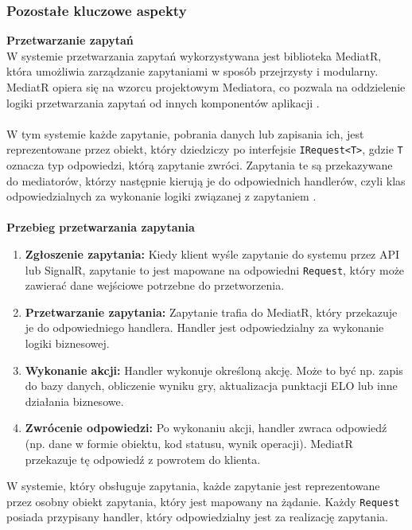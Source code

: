 \documentclass[twoside]{projektInzynierskiMS1}
\begin{document}
\newpage

\subsubsection{Pozostałe kluczowe aspekty}

\noindent \textbf{Przetwarzanie zapytań}\\
W systemie przetwarzania zapytań wykorzystywana jest biblioteka MediatR, która umożliwia zarządzanie zapytaniami w sposób przejrzysty i modularny. MediatR opiera się na wzorcu projektowym Mediatora, co pozwala na oddzielenie logiki przetwarzania zapytań od innych komponentów aplikacji \cite{MediatR}.
\\\\
W tym systemie każde zapytanie, pobrania danych lub zapisania ich, jest reprezentowane przez obiekt, który dziedziczy po interfejsie \texttt{IRequest<T>}, gdzie \texttt{T} oznacza typ odpowiedzi, którą zapytanie zwróci. Zapytania te są przekazywane do mediatorów, którzy następnie kierują je do odpowiednich handlerów, czyli klas odpowiedzialnych za wykonanie logiki związanej z zapytaniem \cite{MediatR}.
\\\\

\noindent \textbf{Przebieg przetwarzania zapytania}
\begin{enumerate}
    \item \textbf{Zgłoszenie zapytania:} Kiedy klient wyśle zapytanie do systemu przez API lub SignalR, zapytanie to jest mapowane na odpowiedni \texttt{Request}, który może zawierać dane wejściowe potrzebne do przetworzenia.
    \item \textbf{Przetwarzanie zapytania:} Zapytanie trafia do MediatR, który przekazuje je do odpowiedniego handlera. Handler jest odpowiedzialny za wykonanie logiki biznesowej.
    \item \textbf{Wykonanie akcji:} Handler wykonuje określoną akcję. Może to być np. zapis do bazy danych, obliczenie wyniku gry, aktualizacja punktacji ELO lub inne działania biznesowe.
    \item \textbf{Zwrócenie odpowiedzi:} Po wykonaniu akcji, handler zwraca odpowiedź (np. dane w formie obiektu, kod statusu, wynik operacji). MediatR przekazuje tę odpowiedź z powrotem do klienta.
\end{enumerate}

\noindent
W systemie, który obsługuje zapytania, każde zapytanie jest reprezentowane przez osobny obiekt zapytania, który jest mapowany na żądanie. Każdy \texttt{Request} posiada przypisany handler, który odpowiedzialny jest za realizację zapytania.
\end{document}
